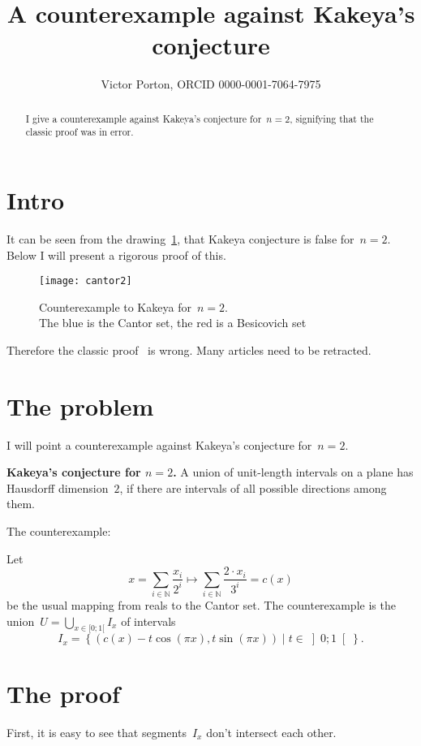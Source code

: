 \documentclass[oneside,draft]{amsart}
\title{A counterexample against Kakeya's conjecture}
\author{Victor Porton, ORCID 0000-0001-7064-7975}
\newcommand{\setcond}[2]{\left\{#1\mid#2\right\}}
\begin{document}
\begin{abstract}
I give a counterexample against Kakeya's conjecture for~$n=2$, signifying that the classic proof was in error.
\end{abstract}

\maketitle  

\section{Intro}

It can be seen from the drawing~\ref{fig:example}, that Kakeya conjecture is false for~$n=2$. Below I will present a rigorous proof of this.

\begin{figure}[hbt]
    \centering
    \texttt{[image: cantor2]}
    \caption{Counterexample to Kakeya for~$n=2$.\\The blue is the Cantor set, the red is a Besicovich set}
    \label{fig:example}
\end{figure}

Therefore the classic proof~\cite{kakeya2d} is wrong. Many articles need to be retracted.

\section{The problem}

I will point a counterexample against Kakeya's conjecture for~$n=2$.

\textbf{Kakeya's conjecture for $n=2$.} A union of unit-length intervals on a plane has Hausdorff dimension~$2$, if there are intervals of all possible directions among them.

The counterexample:

Let \[ x = \sum_{i\in\mathbb{N}} \frac{x_i}{2^i} \mapsto \sum_{i\in\mathbb{N}} \frac{2\cdot x_i}{3^i} = c(x) \] be the usual mapping from reals to the Cantor set.
The counterexample is the union~$U=\bigcup_{x\in[0;1[}I_x$ of intervals \[ I_x = \setcond{(c(x)-t\cos(\pi x), t\sin(\pi x))}{t\in\left]0;1\right[}. \]

\section{The proof}

First, it is easy to see that segments~$I_x$ don't intersect each other.
\end{document}

